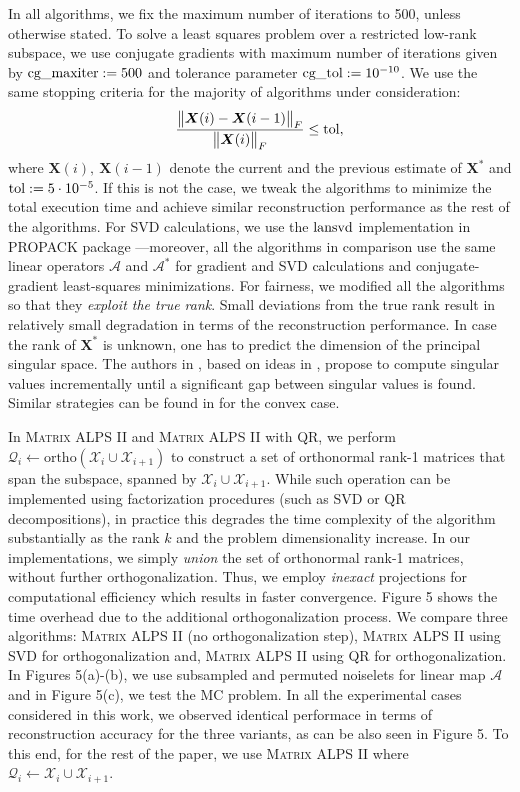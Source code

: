\documentclass[twocolumn]{svjour3}
\newcommand{\vectornormbig}[1]{\big\|#1\big\|}
\newcommand{\sensing}{\boldsymbol{\mathcal{A}}}
\newcommand{\signal}{\boldsymbol{X}}
\newcommand{\bestsignal}{\boldsymbol{X}^\ast}
\newcommand{\rank}{k}
\begin{document}
In all algorithms, we fix the maximum number of iterations to 500, unless otherwise stated. To solve a least squares problem over a restricted low-rank subspace, we use conjugate gradients with maximum number of iterations given by $\rm{cg\_maxiter}:= 500$ and tolerance parameter $\rm{cg\_tol} := 10^{-10}$. We use the same stopping criteria for the majority of algorithms under consideration:
\begin{align}
\frac{\vectornormbig{\signal(i) - \signal(i-1)}_F}{\vectornormbig{\signal(i)}_F} \leq \rm{tol},
\end{align} where $\signal(i), ~\signal(i-1) $ denote the current and the previous estimate of $\bestsignal$ and $\rm{tol} := 5\cdot 10^{-5}$. If this is not the case, we tweak the algorithms to minimize the total execution time and achieve similar reconstruction performance as the rest of the algorithms. For SVD calculations, we use the $\rm{lansvd}$ implementation in PROPACK package \cite{propack}---moreover, all the algorithms in comparison use the same linear operators $\sensing$ and $\sensing^{\ast}$ for gradient and SVD calculations and conjugate-gradient least-squares minimizations. For fairness, we modified all the algorithms so that they {\it exploit the true rank}. Small deviations from the true rank result in relatively small degradation in terms of the reconstruction performance. In case the rank of $\bestsignal$ is unknown, one has to predict the dimension of the principal singular space. The authors in \cite{SVP}, based on ideas in \cite{OptSpace}, propose to compute singular values incrementally until a significant gap between singular values is found. Similar strategies can be found in \cite{ALM} for the convex case.

In \textsc{Matrix ALPS II} and \textsc{Matrix ALPS II} with QR, we perform $\mathcal{Q}_i \leftarrow \text{ortho}(\mathcal{X}_i \cup \mathcal{X}_{i+1})$ to construct a set of orthonormal rank-1 matrices that span the subspace, spanned by $\mathcal{X}_i \cup \mathcal{X}_{i+1}$. 
While such operation can be implemented using factorization procedures (such as SVD or QR decompositions), in practice this degrades the time complexity of the algorithm substantially as the rank $\rank$ and the problem dimensionality increase. In our implementations, we simply {\it union} the set of orthonormal rank-1 matrices, without further orthogonalization. Thus, we employ {\it inexact} projections for computational efficiency which results in faster convergence. Figure 5 shows the time overhead due to the additional orthogonalization process. We compare three algorithms: \textsc{Matrix ALPS II} (no orthogonalization step), \textsc{Matrix ALPS II} using SVD for orthogonalization and, \textsc{Matrix ALPS II} using QR for orthogonalization. In Figures 5(a)-(b), we use subsampled and permuted noiselets for linear map $\sensing$ and in Figure 5(c), we test the MC problem. In all the experimental cases considered in this work, we observed identical performace in terms of reconstruction accuracy for the three variants, as can be also seen in Figure 5. To this end, for the rest of the paper, we use \textsc{Matrix ALPS II} where $\mathcal{Q}_i \leftarrow \mathcal{X}_i \cup \mathcal{X}_{i+1}$.
\end{document}
